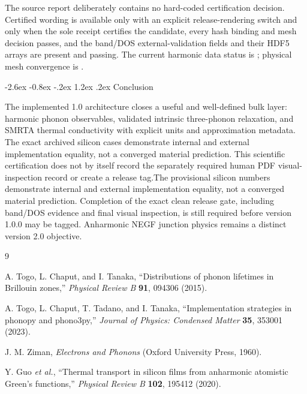 \documentclass[11pt,a4paper]{article}
\makeatletter
\renewcommand\section{\@startsection{section}{1}{\z@}%
  {-2.6ex \@plus -0.8ex \@minus -.2ex}%
  {1.2ex \@plus .2ex}%
  {\normalfont\Large\sffamily\bfseries\color{ink}}}
\makeatother
\begin{document}
The source report deliberately contains no hard-coded certification decision.
Certified wording is available only with an explicit release-rendering switch
and only when the sole receipt certifies the candidate, every hash binding and
mesh decision passes, and the band/DOS external-validation fields and their
HDF5 arrays are present and passing.
The current harmonic data status is \textbf{\HarmonicDataStatus}; physical mesh
convergence is \textbf{\PhysicalConvergenceStatus}.

\section{Conclusion}

The implemented 1.0 architecture closes a useful and well-defined bulk layer:
harmonic phonon observables, validated intrinsic three-phonon relaxation, and
SMRTA thermal conductivity with explicit units and approximation metadata.
\ifreportcertified The exact archived silicon cases demonstrate internal and
external implementation equality, not a converged material prediction. This
scientific certification does not by itself record the separately required
human PDF visual-inspection record or create a release tag.\else The provisional
silicon numbers demonstrate internal and external implementation equality,
not a converged material prediction. Completion of the exact clean release
gate, including band/DOS evidence and final visual inspection, is still
required before version 1.0.0 may be tagged.\fi{} Anharmonic NEGF junction
physics remains a distinct version 2.0 objective.

\begin{thebibliography}{9}

A. Togo, L. Chaput, and I. Tanaka,
``Distributions of phonon lifetimes in Brillouin zones,''
\emph{Physical Review B} \textbf{91}, 094306 (2015).

A. Togo, L. Chaput, T. Tadano, and I. Tanaka,
``Implementation strategies in phonopy and phono3py,''
\emph{Journal of Physics: Condensed Matter} \textbf{35}, 353001 (2023).

J. M. Ziman,
\emph{Electrons and Phonons} (Oxford University Press, 1960).

Y. Guo \emph{et al.},
``Thermal transport in silicon films from anharmonic atomistic Green's
functions,'' \emph{Physical Review B} \textbf{102}, 195412 (2020).

\end{thebibliography}
\end{document}
